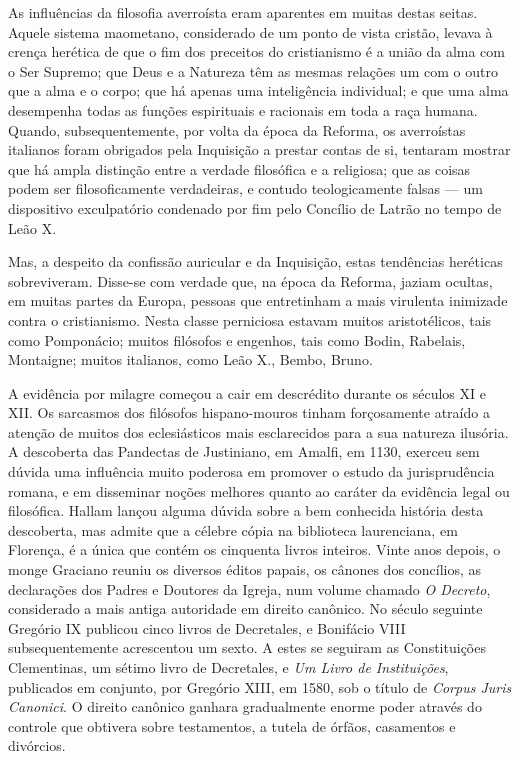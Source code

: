 \documentclass[11pt,a5paper,twoside,openany]{book}
\begin{document}
As influências da filosofia averroísta eram aparentes em muitas destas seitas. Aquele sistema maometano, considerado de um ponto de vista cristão, levava à crença herética de que o fim dos preceitos do cristianismo é a união da alma com o Ser Supremo; que Deus e a Natureza têm as mesmas relações um com o outro que a alma e o corpo; que há apenas uma inteligência individual; e que uma alma desempenha todas as funções espirituais e racionais em toda a raça humana. Quando, subsequentemente, por volta da época da Reforma, os averroístas italianos foram obrigados pela Inquisição a prestar contas de si, tentaram mostrar que há ampla distinção entre a verdade filosófica e a religiosa; que as coisas podem ser filosoficamente verdadeiras, e contudo teologicamente falsas — um dispositivo exculpatório condenado por fim pelo Concílio de Latrão no tempo de Leão X.

Mas, a despeito da confissão auricular e da Inquisição, estas tendências heréticas sobreviveram. Disse-se com verdade que, na época da Reforma, jaziam ocultas, em muitas partes da Europa, pessoas que entretinham a mais virulenta inimizade contra o cristianismo. Nesta classe perniciosa estavam muitos aristotélicos, tais como Pomponácio; muitos filósofos e engenhos, tais como Bodin, Rabelais, Montaigne; muitos italianos, como Leão X., Bembo, Bruno.

A evidência por milagre começou a cair em descrédito durante os séculos XI e XII. Os sarcasmos dos filósofos hispano-mouros tinham forçosamente atraído a atenção de muitos dos eclesiásticos mais esclarecidos para a sua natureza ilusória. A descoberta das Pandectas de Justiniano, em Amalfi, em 1130, exerceu sem dúvida uma influência muito poderosa em promover o estudo da jurisprudência romana, e em disseminar noções melhores quanto ao caráter da evidência legal ou filosófica. Hallam lançou alguma dúvida sobre a bem conhecida história desta descoberta, mas admite que a célebre cópia na biblioteca laurenciana, em Florença, é a única que contém os cinquenta livros inteiros. Vinte anos depois, o monge Graciano reuniu os diversos éditos papais, os cânones dos concílios, as declarações dos Padres e Doutores da Igreja, num volume chamado \textit{O Decreto}, considerado a mais antiga autoridade em direito canônico. No século seguinte Gregório IX publicou cinco livros de Decretales, e Bonifácio VIII subsequentemente acrescentou um sexto. A estes se seguiram as Constituições Clementinas, um sétimo livro de Decretales, e \textit{Um Livro de Instituições}, publicados em conjunto, por Gregório XIII, em 1580, sob o título de \textit{Corpus Juris Canonici}. O direito canônico ganhara gradualmente enorme poder através do controle que obtivera sobre testamentos, a tutela de órfãos, casamentos e divórcios.
\end{document}

